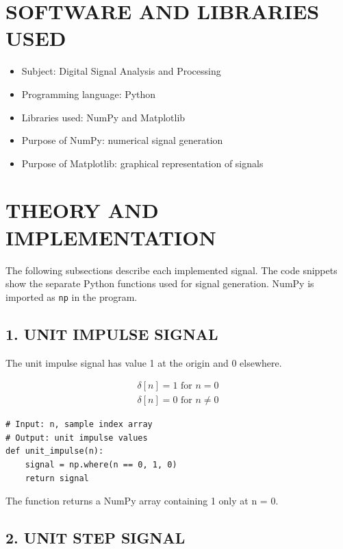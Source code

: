 \documentclass[12pt,a4paper]{article}
\begin{document}
\section*{SOFTWARE AND LIBRARIES USED}

\begin{itemize}
    \item Subject: Digital Signal Analysis and Processing

    \item Programming language: Python
    \item Libraries used: NumPy and Matplotlib
    \item Purpose of NumPy: numerical signal generation
    \item Purpose of Matplotlib: graphical representation of signals
\end{itemize}

\section*{THEORY AND IMPLEMENTATION}

The following subsections describe each implemented signal. The code snippets show the separate Python functions used for signal generation. NumPy is imported as \texttt{np} in the program.

\subsection*{1. UNIT IMPULSE SIGNAL}

The unit impulse signal has value 1 at the origin and 0 elsewhere.

\[
\begin{aligned}
\delta[n] = 1 \text{ for } n = 0 \\
\delta[n] = 0 \text{ for } n \neq 0
\end{aligned}
\]

\begin{lstlisting}[style=pythoncode]
# Input: n, sample index array
# Output: unit impulse values
def unit_impulse(n):
    signal = np.where(n == 0, 1, 0)
    return signal
\end{lstlisting}

The function returns a NumPy array containing 1 only at n = 0.

\subsection*{2. UNIT STEP SIGNAL}
\end{document}
